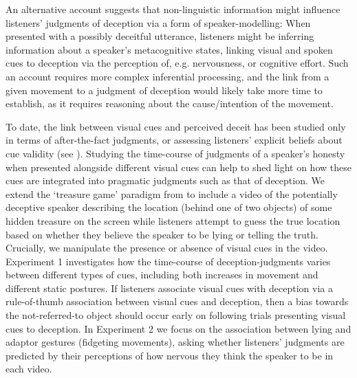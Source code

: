 \documentclass[a4paper,man,natbib]{apa6}
\begin{document}
An alternative account suggests that non-linguistic information might influence listeners' judgments of deception via a form of speaker-modelling: 
When presented with a possibly deceitful utterance, listeners might be inferring information about a speaker's metacognitive states, linking visual and spoken cues to deception via the perception of, e.g. nervousness, or cognitive effort. 
Such an account requires more complex inferential processing, and the link from a given movement to a judgment of deception would likely take more time to establish, as it requires reasoning about the cause/intention of the movement. %

To date, the link between visual cues and perceived deceit has been studied only in terms of after-the-fact judgments, or assessing listeners' explicit beliefs about cue validity (see \citealt{Vrij1996a, Zuckerman1981a}).
Studying the time-course of judgments of a speaker's honesty when presented alongside different visual cues can help to shed light on how these cues are integrated into pragmatic judgments such as that of deception.
We extend the `treasure game' paradigm from \citet{Loy2017} to include a video of the potentially deceptive speaker describing the location (behind one of two objects) of some hidden treasure on the screen while listeners attempt to guess the true location based on whether they believe the speaker to be lying or telling the truth. 
Crucially, we manipulate the presence or absence of visual cues in the video.
Experiment 1 investigates how the time-course of deception-judgments varies between different types of cues, including both increases in movement and different static postures.
If listeners associate visual cues with deception via a rule-of-thumb association between visual cues and deception, then a bias towards the not-referred-to object should occur early on following trials presenting visual cues to deception.
In Experiment 2 we focus on the association between lying and adaptor gestures (fidgeting movements), asking whether listeners' judgments are predicted by their perceptions of how nervous they think the speaker to be in each video.
\end{document}
